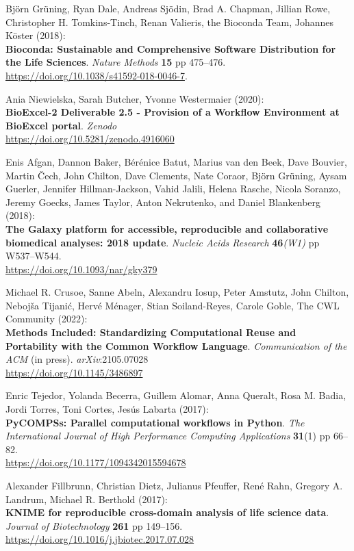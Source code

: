 \begin{thebibliography}{9}
 Björn Grüning, Ryan Dale, Andreas Sjödin, Brad A. Chapman,
Jillian Rowe, Christopher H. Tomkins-Tinch, Renan Valieris, the Bioconda
Team, Johannes Köster (2018):\\
\textbf{Bioconda: Sustainable and Comprehensive Software Distribution
for the Life Sciences}. \emph{Nature Methods} \textbf{15} pp 475--476.\\
\url{https://doi.org/10.1038/s41592-018-0046-7}.

 Ania Niewielska, Sarah Butcher, Yvonne Westermaier (2020):\\
\textbf{BioExcel-2 Deliverable 2.5 - Provision of a Workflow Environment
at BioExcel portal}. \emph{Zenodo}\\
\url{https://doi.org/10.5281/zenodo.4916060}

 Enis Afgan, Dannon Baker, Bérénice Batut, Marius van den Beek,
Dave Bouvier, Martin Čech, John Chilton, Dave Clements, Nate Coraor,
Björn Grüning, Aysam Guerler, Jennifer Hillman-Jackson, Vahid Jalili,
Helena Rasche, Nicola Soranzo, Jeremy Goecks, James Taylor, Anton
Nekrutenko, and Daniel Blankenberg (2018):\\
\textbf{The Galaxy platform for accessible, reproducible and
collaborative biomedical analyses: 2018 update}. \emph{Nucleic Acids
Research} \textbf{46}\emph{(W1)} pp W537--W544.\\
\url{https://doi.org/10.1093/nar/gky379}

 Michael R. Crusoe, Sanne Abeln, Alexandru Iosup, Peter Amstutz,
John Chilton, Nebojša Tijanić, Hervé Ménager, Stian Soiland-Reyes,
Carole Goble, The CWL Community (2022):\\
\textbf{Methods Included: Standardizing Computational Reuse and
Portability with the Common Workflow Language}. \emph{Communication of
the ACM} (in press). \emph{arXiv}:2105.07028\\
\url{https://doi.org/10.1145/3486897}

 Enric Tejedor, Yolanda Becerra, Guillem Alomar, Anna Queralt,
Rosa M. Badia, Jordi Torres, Toni Cortes, Jesús Labarta (2017):\\
\textbf{PyCOMPSs: Parallel computational workflows in Python}. \emph{The
International Journal of High Performance Computing Applications}
\textbf{31}(1) pp 66--82.\\
\url{https://doi.org/10.1177/1094342015594678}

 Alexander Fillbrunn, Christian Dietz, Julianus Pfeuffer, René
Rahn, Gregory A. Landrum, Michael R. Berthold (2017):\\
\textbf{KNIME for reproducible cross-domain analysis of life science
data}. \emph{Journal of Biotechnology} \textbf{261} pp 149--156.\\
\url{https://doi.org/10.1016/j.jbiotec.2017.07.028}


\end{thebibliography}
